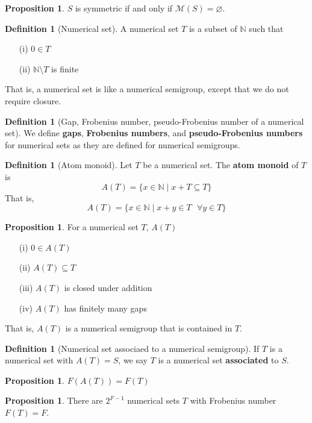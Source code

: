 \documentclass{article}
\theoremstyle{definition}
\theoremstyle{definition}
\newtheorem{defn}[thm]{Definition}
\theoremstyle{definition}
\newtheorem{prop}[thm]{Proposition}
\begin{document}
\begin{prop}
    $S$ is symmetric if and only if $\mathcal{M}(S) = \varnothing$.
\end{prop}

\begin{defn}[Numerical set]
    A numerical set $T$ is a subset of $\mathbb{N}$ such that 
    \begin{enumerate}
        \item[(i)] $0\in T$
        \item[(ii)] $\mathbb{N} \setminus T$ is finite 
    \end{enumerate}
    That is, a numerical set is like a numerical semigroup, except that we do not require closure.
\end{defn}

\begin{defn}[Gap, Frobenius number, pseudo-Frobenius number of a numerical set]
    We define \textbf{gaps}, \textbf{Frobenius numbers}, and \textbf{pseudo-Frobenius numbers} for numerical sets as they are defined for numerical semigroups.
\end{defn}

\begin{defn}[Atom monoid]
    Let $T$ be a numerical set. The \textbf{atom monoid} of $T$ is 
    $$A(T) = \{x \in \mathbb{N} \mid x+ T \subseteq T\}$$
    That is, 
    $$A(T) = \{x \in \mathbb{N} \mid x+ y \in T \text{ } \forall y \in T\}$$
\end{defn}

\begin{prop}
For a numerical set $T$, $A(T)$
    \begin{enumerate}
        \item[(i)] $0 \in A(T)$ 
        \item[(ii)] $A(T) \subseteq T$
        \item[(iii)] $A(T)$ is closed under addition
        \item[(iv)] $A(T)$ has finitely many gaps
    \end{enumerate}

    That is, $A(T)$ is a numerical semigroup that is contained in $T$.
\end{prop}

\begin{defn}[Numerical set associaed to a numerical semigroup]
    If $T$ is a numerical set with $A(T) = S$, we say $T$ is a numerical set \textbf{associated} to $S$.
\end{defn}

\begin{prop}
    $F(A(T)) = F(T)$
\end{prop}

\begin{prop}
    There are $2^{F-1}$ numerical sets $T$ with Frobenius number $F(T) = F$.
\end{prop}
\end{document}
